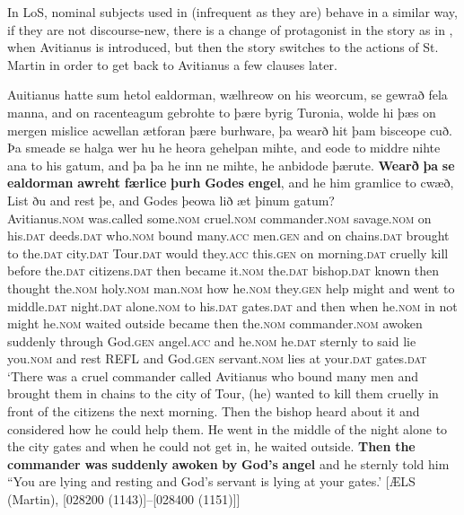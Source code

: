\documentclass[output=paper,colorlinks,citecolor=brown]{langscibook}
\begin{document}
In LoS, nominal subjects used in  (infrequent as they are) behave in a similar way, if they are not discourse-new, there is a change of protagonist in the story as in , when Avitianus is introduced, but then the story switches to the actions of St. Martin in order to get back to Avitianus a few clauses later.

\ea%
\label{ex:cichosz:21}
\gll Auitianus     hatte     sum     hetol     ealdorman,
wælhreow   on   his     weorcum,   se     gewrað
fela     manna,     and   on   racenteagum   gebrohte   to þære     byrig     Turonia,   wolde   hi     þæs     on 
mergen     mislice     acwellan   ætforan   þære 
burhware,   þa   wearð   hit   þam     bisceope   cuð.
Þa   smeade   se     halga     wer     hu   he   
heora     gehelpan   mihte,   and   eode   to   middre
nihte     ana     to   his     gatum,     and   þa
þa   he     inn   ne   mihte,   he     anbidode   þærute. 
\textbf{Wearð}   \textbf{þa}   \textbf{se}     \textbf{ealdorman}     \textbf{awreht}     \textbf{færlice} 
\textbf{þurh}   \textbf{Godes}     \textbf{engel},     and   he     him   gramlice   to 
cwæð,   List   ðu     and   rest   þe,   and   Godes
þeowa      lið   æt   þinum     gatum?\\
Avitianus.\textsc{nom}    was.called  some.\textsc{nom}  cruel.\textsc{nom}  commander.\textsc{nom}
savage.\textsc{nom}  on  his.\textsc{dat}   deeds.\textsc{dat}  who.\textsc{nom}  bound
many.\textsc{acc}  men.\textsc{gen}  and  on  chains.\textsc{dat}  brought    to  the.\textsc{dat}  city.\textsc{dat}  Tour.\textsc{dat}  would  they.\textsc{acc}  this.\textsc{gen}  on
morning.\textsc{dat}  cruelly    kill    before    the.\textsc{dat} 
citizens.\textsc{dat}   then  became  it.\textsc{nom}  the.\textsc{dat}  bishop.\textsc{dat}    known
then  thought  the.\textsc{nom}  holy.\textsc{nom}  man.\textsc{nom}  how  he.\textsc{nom}
they.\textsc{gen}  help    might  and  went  to  middle.\textsc{dat}
night.\textsc{dat}  alone.\textsc{nom}  to  his.\textsc{dat}  gates.\textsc{dat}  and  then
when  he.\textsc{nom}  in  not   might  he.\textsc{nom}  waited    outside
became  then  the.\textsc{nom}  commander.\textsc{nom}  awoken    suddenly
through  God.\textsc{gen}  angel.\textsc{acc}  and  he.\textsc{nom}  he.\textsc{dat}  sternly    to
said  lie  you.\textsc{nom}  and  rest  REFL  and  God.\textsc{gen}
servant.\textsc{nom}  lies  at   your.\textsc{dat}   gates.\textsc{dat}\\
\glt ‘There was a cruel commander called Avitianus who bound many men and brought them in chains to the city of Tour, (he) wanted to kill them cruelly in front of the citizens the next morning. Then the bishop heard about it and considered how he could help them. He went in the middle of the night alone to the city gates and when he could not get in, he waited outside. \textbf{Then} \textbf{the} \textbf{commander} \textbf{was} \textbf{suddenly} \textbf{awoken} \textbf{by} \textbf{God's} \textbf{angel} and he sternly told him “You are lying and resting and God's servant is lying at your gates.' \hfill [ÆLS (Martin), [028200 (1143)]--[028400 (1151)]]
\z 
\end{document}
